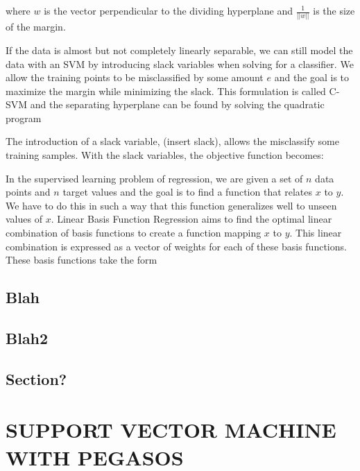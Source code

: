 \documentclass[a4paper,twoside]{article}
\begin{document}
where $w$ is the vector perpendicular to the dividing hyperplane and $\frac{1}{||w||}$ is the size of the margin.

If the data is almost but not completely linearly separable, we can still model the data with an SVM by introducing slack variables when solving for a classifier. We allow the training points to be misclassified by some amount $e$ and the goal is to maximize the margin while minimizing the slack. This formulation is called C-SVM and the separating hyperplane can be found by solving the quadratic program 


 The introduction of a slack variable, (insert slack), allows the misclassify some training samples. With the slack variables, the objective function becomes:

In the supervised learning problem of regression, we are given a set of $n$ data points and $n$ target values and the goal is to find a function that relates $x$ to $y$. We have to do this in such a way that this function generalizes well to unseen values of $x$. Linear Basis Function Regression aims to find the optimal linear combination of basis functions to create a function mapping $x$ to $y$. This linear combination is expressed as a vector of weights for each of these basis functions. These basis functions take the form

\subsection{Blah}


\subsection{Blah2}


\subsection{Section?}




\section{\uppercase{Support Vector Machine with Pegasos}}
\end{document}
